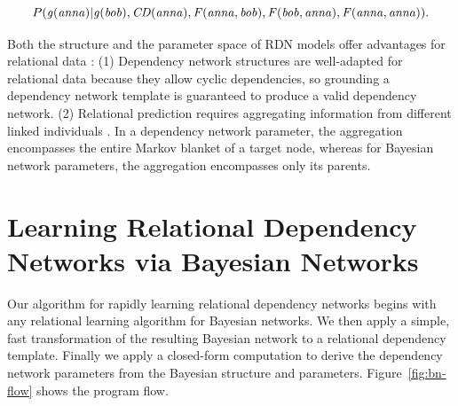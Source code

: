 \documentclass[runningheads,a4paper]{llncs}
\newcommand{\fixneeded}[1]{\textbf{[\footnotesize #1]}}
\newcommand{\iid}{i.i.d.}
\begin{document}
$$P(\it{g(anna)}|\it{g(bob)}, \it{CD(anna)}, \it{F(anna,bob)},\it{F(bob,anna)},\it{F(anna,anna)}).$$


\noindent Both the structure and the parameter space of RDN models offer advantages for relational data \cite{Neville2007,Natarajan2012}: (1) Dependency network structures are well-adapted for relational data because they allow cyclic dependencies, so grounding a dependency network template is guaranteed to produce a valid dependency network.
%
(2) Relational prediction  requires aggregating information from different linked individuals \cite{Natarajan2008}. 
In a dependency network parameter, the aggregation encompasses the entire Markov blanket of a target node, whereas for Bayesian network parameters, the aggregation encompasses only its parents.
%

\section{Learning Relational Dependency Networks via Bayesian Networks}
Our algorithm for rapidly learning relational dependency networks
begins with any relational learning algorithm for Bayesian networks. We then apply a simple, fast transformation of the resulting Bayesian network to a relational dependency template. Finally we apply a closed-form computation to derive the dependency network parameters from the Bayesian structure and parameters. Figure~\ref{fig:bn-flow} shows the program flow. 
\end{document}
